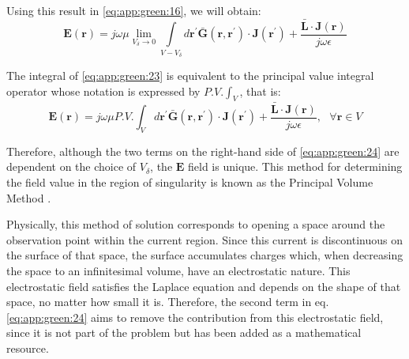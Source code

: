 			Using this result in \eqref{eq:app:green:16}, we will obtain:
			\begin{equation}
				\mathbf{E}(\mathbf{r}) = j\omega\mu\lim\limits_{V_\delta\rightarrow0}\int\limits_{V-V_\delta}d\mathbf{r^\prime}\mathbf{\bar{G}}(\mathbf{r}, \mathbf{r^\prime})\cdot\mathbf{J}(\mathbf{r^\prime}) + \frac{\mathbf{\bar{L}}\cdot\mathbf{J}(\mathbf{r})}{j\omega\epsilon} \label{eq:app:green:23}
			\end{equation}
		
			The integral of \eqref{eq:app:green:23} is equivalent to the principal value integral operator whose notation is expressed by $P.V.\int_V$, that is:
			\begin{equation}
				\mathbf{E}(\mathbf{r}) = j\omega\mu P.V.\int_V d\mathbf{r^\prime}\mathbf{\bar{G}}(\mathbf{r}, \mathbf{r^\prime})\cdot\mathbf{J}(\mathbf{r^\prime}) + \frac{\mathbf{\bar{L}}\cdot\mathbf{J}(\mathbf{r})}{j\omega\epsilon},~~~\forall\mathbf{r}\in V \label{eq:app:green:24}
			\end{equation}
			
			Therefore, although the two terms on the right-hand side of \eqref{eq:app:green:24} are dependent on the choice of $V_\delta$, the $\mathbf{E}$ field is unique. This method for determining the field value in the region of singularity is known as the Principal Volume Method \citep{vanbladel1961some}.
			
			Physically, this method of solution corresponds to opening a space around the observation point within the current region. Since this current is discontinuous on the surface of that space, the surface accumulates charges which, when decreasing the space to an infinitesimal volume, have an electrostatic nature. This electrostatic field satisfies the Laplace equation and depends on the shape of that space, no matter how small it is. Therefore, the second term in eq.\eqref{eq:app:green:24} aims to remove the contribution from this electrostatic field, since it is not part of the problem but has been added as a mathematical resource.
			
